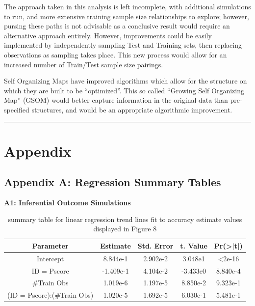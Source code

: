 \documentclass[12pt,]{article}
\begin{document}
The approach taken in this analysis is left incomplete, with additional
simulations to run, and more extensive training sample size
relationships to explore; however, pursing these paths is not advisable
as a conclusive result would require an alternative approach entirely.
However, improvements could be easily implemented by independently
sampling Test and Training sets, then replacing observations as sampling
takes place. This new process would allow for an increased number of
Train/Test sample size pairings.

Self Organizing Maps have improved algorithms which allow for the
structure on which they are built to be ``optimized''. This so called
``Growing Self Organizing Map'' (GSOM) would better capture information
in the original data than pre-specified structures, and would be an
appropriate algorithmic improvement.

\begin{center}\rule{0.5\linewidth}{\linethickness}\end{center}

\newpage

\hypertarget{appendix}{%
\section{Appendix}\label{appendix}}

\hypertarget{appendix-a-regression-summary-tables}{%
\subsection{Appendix A: Regression Summary
Tables}\label{appendix-a-regression-summary-tables}}

\textbf{A1: Inferential Outcome Simulations}

\begin{table}[h!]
\begin{center}
\begin{tabular}{|c|c|c|c|c|}
\hline
Parameter                      & Estimate  & Std. Error & t. Value  & Pr(>|t|) \\
\hline
\hline
Intercept                      &  8.844e-1 &  2.902e-2  &  3.048e1  & <2e-16   \\                             
\hline
ID = Pscore                    & -1.409e-1 &  4.104e-2  & -3.433e0  & 8.840e-4 \\
\hline
\#Train Obs                    &  1.019e-6 &  1.197e-5  &  8.850e-2 & 9.323e-1 \\
\hline
(ID = Pscore):(\#Train Obs) &  1.020e-5 &  1.692e-5  &  6.030e-1 & 5.481e-1 \\
\hline
\end{tabular}
\end{center}
\caption[A1: Inferential Outcome Simulation Regression Summary Tables]{summary table for linear regression trend lines fit to accuracy estimate values displayed in Figure 8}
\end{table}
\end{document}
